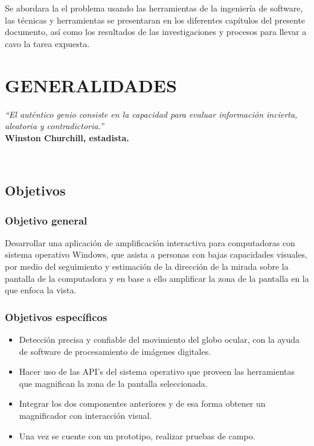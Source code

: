 \documentclass[12pt]{book} %
\begin{document}
	Se abordara la el problema usando las herramientas de la ingeniería de software, las técnicas y herramientas se presentaran 
	en los diferentes capítulos del presente documento, así como los resultados de las investigaciones y procesos para llevar a cavo 
	la tarea expuesta.

\newpage



\chapter{GENERALIDADES \label{generalidades}}
\thispagestyle{empty}

\begin{minipage}{0.5\textwidth}
	\begin{flushleft} \large
	\scriptsize	\textsl{\large “El auténtico genio consiste en la capacidad para evaluar información incierta, 
								aleatoria y contradictoria.”}\\
	\scriptsize \textbf{Winston Churchill, estadista.}
	\end{flushleft}
\end{minipage}\\[4cm]			

\newpage
\section{Objetivos \label{objetivos}}
	\subsection{Objetivo general}
	
		Desarrollar una aplicación de amplificación interactiva para computadoras con sistema operativo Windows, 
		que asista a personas con bajas capacidades visuales, por medio del seguimiento y estimación de la dirección 
		de la mirada sobre la pantalla de la computadora y en base a ello amplificar la zona de la pantalla en la 
		que enfoca la vista.
	
	\subsection{Objetivos específicos}
		\begin{itemize}
			\item Detección precisa y confiable del movimiento del globo ocular, con la ayuda de software de 
			procesamiento de imágenes digitales.
			\item Hacer uso de las API’s del sistema operativo que proveen las herramientas que magnifican la zona de
			la pantalla seleccionada.
			\item Integrar los dos componentes anteriores y de esa forma obtener un magnificador con interacción visual.
			\item Una vez se cuente con un prototipo, realizar pruebas de campo.
		\end{itemize}
		
\end{document}
